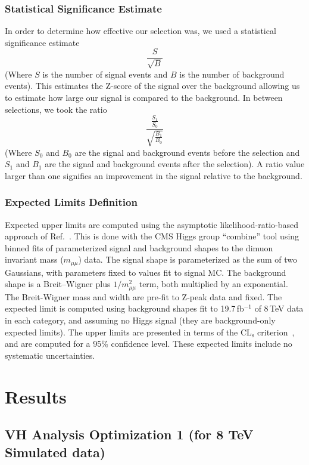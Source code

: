 \documentclass[12pt]{article}
\begin{document}
\subsubsection{Statistical Significance Estimate}

In order to determine how effective our selection was, we used a statistical significance estimate 
	\[\frac{S}{\sqrt{B}} \] 
(Where $S$ is the number of signal events and $B$ is the number of background events). 
This estimates the Z-score of the signal over the background allowing us to estimate how large our signal is compared to the background. 
In between selections, we took the ratio 
	\[\frac{\frac{S_{1}}{S_{0}}}{\sqrt{\frac{B_{1}}{B_{0}}}} \] 
(Where $S_{0}$ and $B_{0}$ are the signal and background events before the selection 
and $S_{1}$ and $B_{1}$ are the signal and background events after the selection). 
A ratio value larger than one signifies an improvement in the signal relative to the background.

\subsubsection{Expected Limits Definition}

Expected upper limits are computed using the asymptotic likelihood-ratio-based approach of 
Ref.~\cite{stats}.  This is done with the CMS Higgs group ``combine'' tool using binned
fits of parameterized signal and background shapes to the dimuon invariant mass 
($m_{\mu\mu}$) data.  The signal shape is parameterized
as the sum of two Gaussians, with parameters fixed to values fit to signal MC.
The background shape is a Breit--Wigner plus $1/m_{\mu\mu}^2$ term, both multiplied
by an exponential.  The Breit-Wigner mass and width are pre-fit to Z-peak data and fixed.
The expected limit is computed
using background shapes fit to 19.7\,fb$^{-1}$ of 8\,TeV data in each category,
and assuming no Higgs signal (they are background-only expected limits).  The upper
limits are presented in terms of the $\mathrm{CL_s}$ criterion~\cite{cls}, and are computed for 
a 95\% confidence level.  These expected limits include no systematic uncertainties.

\section{Results}

\subsection{VH Analysis Optimization 1 (for 8 TeV Simulated data)}
\end{document}
